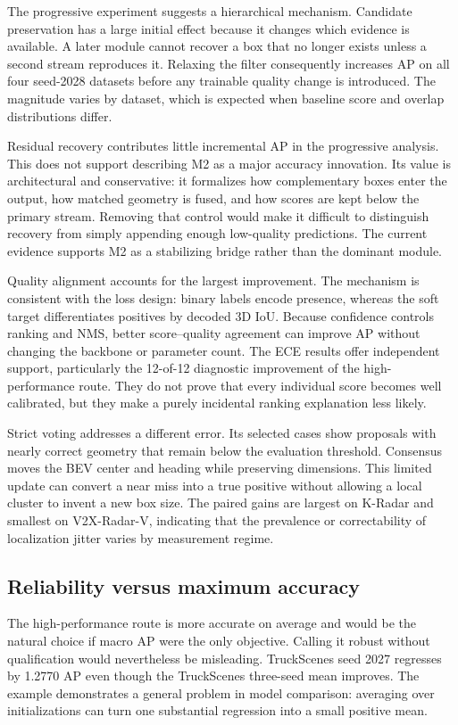 \documentclass[preprint,12pt,times]{elsarticle}
\begin{document}
The progressive experiment suggests a hierarchical mechanism. Candidate
preservation has a large initial effect because it changes which evidence is
available. A later module cannot recover a box that no longer exists unless a
second stream reproduces it. Relaxing the filter consequently increases AP on
all four seed-2028 datasets before any trainable quality change is introduced.
The magnitude varies by dataset, which is expected when baseline score and
overlap distributions differ.

Residual recovery contributes little incremental AP in the progressive analysis.
This does not support describing M2 as a major accuracy innovation. Its value
is architectural and conservative: it formalizes how complementary boxes enter
the output, how matched geometry is fused, and how scores are kept below the
primary stream. Removing that control would make it difficult to distinguish
recovery from simply appending enough low-quality predictions. The current
evidence supports M2 as a stabilizing bridge rather than the dominant module.

Quality alignment accounts for the largest improvement. The mechanism is
consistent with the loss design: binary labels encode presence, whereas the
soft target differentiates positives by decoded 3D IoU. Because confidence
controls ranking and NMS, better score--quality agreement can improve AP
without changing the backbone or parameter count. The ECE results offer
independent support, particularly the 12-of-12 diagnostic improvement of the
high-performance route. They do not prove that every individual score becomes
well calibrated, but they make a purely incidental ranking explanation less
likely.

Strict voting addresses a different error. Its selected cases show proposals
with nearly correct geometry that remain below the evaluation threshold.
Consensus moves the BEV center and heading while preserving dimensions. This
limited update can convert a near miss into a true positive without allowing a
local cluster to invent a new box size. The paired gains are largest on
K-Radar and smallest on V2X-Radar-V, indicating that the prevalence or
correctability of localization jitter varies by measurement regime.

\subsection{Reliability versus maximum accuracy}

The high-performance route is more accurate on average and would be the natural
choice if macro AP were the only objective. Calling it robust without
qualification would nevertheless be misleading. TruckScenes seed 2027
regresses by 1.2770 AP even though the TruckScenes three-seed mean improves.
The example demonstrates a general problem in model comparison: averaging
over initializations can turn one substantial regression into a small positive
mean.
\end{document}
